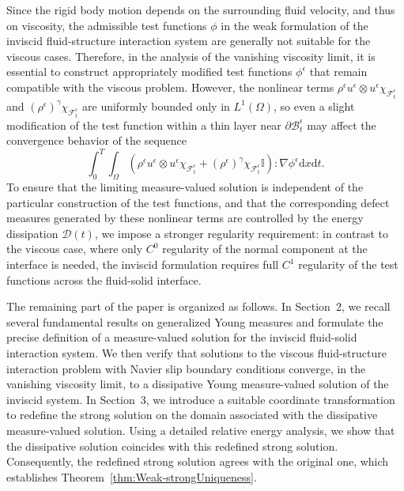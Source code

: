 \documentclass[11pt,twoside,reqno]{amsart}
\numberwithin{equation}{section}
\numberwithin{figure}{section}
\newcommand{\qnt}[1]{\left(#1\right)}
\begin{document}
Since the rigid body motion depends on the surrounding fluid velocity, and thus on viscosity, the admissible test functions $\phi$ in the weak formulation of the inviscid fluid-structure interaction system are generally not suitable for the viscous cases. Therefore, in the analysis of the vanishing viscosity limit, it is essential to construct appropriately modified test functions $\phi^\epsilon$ that remain compatible with the viscous problem. However, the nonlinear terms $\rho^\epsilon u^\epsilon\otimes u^\epsilon\chi_{\mathcal{F}_t^\epsilon}$ and $(\rho^\epsilon)^\gamma\chi_{\mathcal{F}_t^\epsilon}$ are uniformly bounded only in $L^1(\Omega)$, so even a slight modification of the test function within a thin layer near $\partial\mathcal{B}_t^\epsilon$ may affect the convergence behavior of the sequence
\begin{equation*}
    \int_0^T\int_{\Omega}\qnt{\rho^\epsilon u^\epsilon\otimes u^\epsilon\chi_{\mathcal{F}_t^\epsilon}+(\rho^\epsilon)^\gamma\chi_{\mathcal{F}_t^\epsilon}\mathbb{I}}:\nabla\phi^\epsilon \mathrm{d}x\mathrm{d}t. 
\end{equation*}
To ensure that the limiting measure-valued solution is independent of the particular construction of the test functions, and that the corresponding defect measures generated by these nonlinear terms are controlled by the energy dissipation $\mathcal{D}(t)$, we impose a stronger regularity requirement: in contrast to the viscous case, where only $C^0$ regularity of the normal component at the interface is needed, the inviscid formulation requires full $C^1$ regularity of the test functions across the fluid-solid interface.

The remaining part of the paper is organized as follows. 
In Section~2, we recall several fundamental results on generalized Young measures and formulate the precise definition of a measure-valued solution for the inviscid fluid-solid interaction system. We then verify that solutions to the viscous fluid-structure interaction problem with Navier slip boundary conditions converge, in the vanishing viscosity limit, to a dissipative Young measure-valued solution of the inviscid system. 
In Section~3, we introduce a suitable coordinate transformation to redefine the strong solution on the domain associated with the dissipative measure-valued solution. Using a detailed relative energy analysis, we show that the dissipative solution coincides with this redefined strong solution. Consequently, the redefined strong solution agrees with the original one, which establishes Theorem~\ref{thm:Weak-strongUniqueness}.
\end{document}

